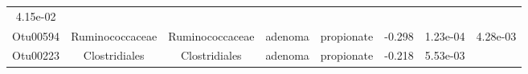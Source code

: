 \documentclass[11pt,]{article}
\begin{document}
\begin{longtable}[]{@{}cccccccc@{}}
\begin{minipage}[t]{0.08\columnwidth}
4.15e-02\strut
\end{minipage}\tabularnewline
\begin{minipage}[t]{0.08\columnwidth}\centering\strut
Otu00594\strut
\end{minipage} & \begin{minipage}[t]{0.15\columnwidth}\centering\strut
Ruminococcaceae\strut
\end{minipage} & \begin{minipage}[t]{0.15\columnwidth}\centering\strut
Ruminococcaceae\strut
\end{minipage} & \begin{minipage}[t]{0.08\columnwidth}\centering\strut
adenoma\strut
\end{minipage} & \begin{minipage}[t]{0.09\columnwidth}\centering\strut
propionate\strut
\end{minipage} & \begin{minipage}[t]{0.07\columnwidth}\centering\strut
-0.298\strut
\end{minipage} & \begin{minipage}[t]{0.08\columnwidth}\centering\strut
1.23e-04\strut
\end{minipage} & \begin{minipage}[t]{0.08\columnwidth}\centering\strut
4.28e-03\strut
\end{minipage}\tabularnewline
\begin{minipage}[t]{0.08\columnwidth}\centering\strut
Otu00223\strut
\end{minipage} & \begin{minipage}[t]{0.15\columnwidth}\centering\strut
Clostridiales\strut
\end{minipage} & \begin{minipage}[t]{0.15\columnwidth}\centering\strut
Clostridiales\strut
\end{minipage} & \begin{minipage}[t]{0.08\columnwidth}\centering\strut
adenoma\strut
\end{minipage} & \begin{minipage}[t]{0.09\columnwidth}\centering\strut
propionate\strut
\end{minipage} & \begin{minipage}[t]{0.07\columnwidth}\centering\strut
-0.218\strut
\end{minipage} & \begin{minipage}[t]{0.08\columnwidth}\centering\strut
5.53e-03\strut
\end{minipage} & \begin{minipage}[t]{0.08\columnwidth}\centering\strut

\end{minipage}
\end{longtable}
\end{document}
